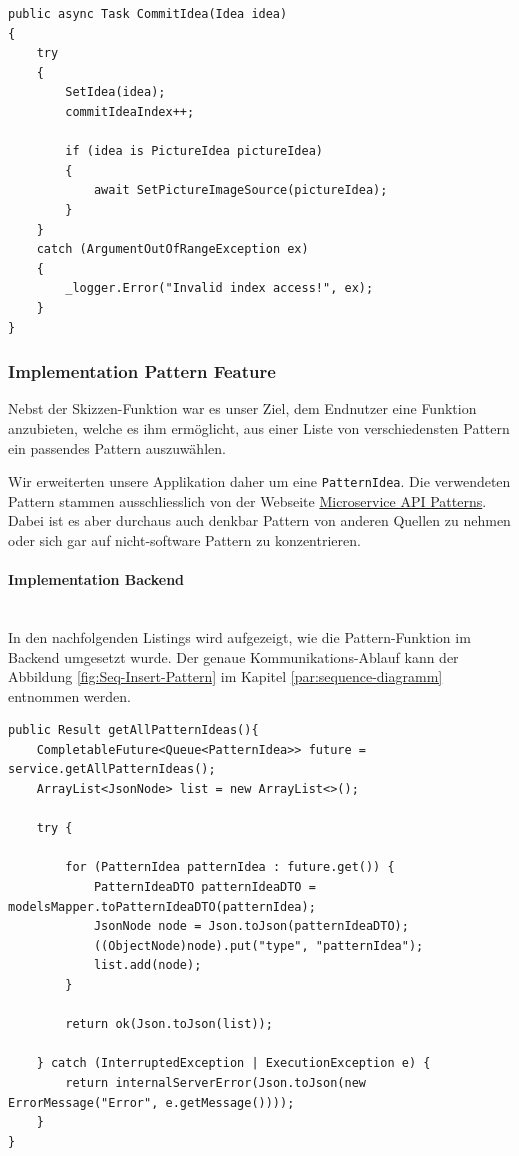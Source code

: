 \begin{lstlisting}[caption={Commit-Idea Methode auf dem BrainstormingService}, label={commit-idea}]
public async Task CommitIdea(Idea idea)
{
	try
	{
		SetIdea(idea);
		commitIdeaIndex++;
		
		if (idea is PictureIdea pictureIdea)
		{
			await SetPictureImageSource(pictureIdea);
		}
	}
	catch (ArgumentOutOfRangeException ex)
	{
		_logger.Error("Invalid index access!", ex);
	}
}
\end{lstlisting}

\subsubsection{Implementation Pattern Feature}
Nebst der Skizzen-Funktion war es unser Ziel, dem Endnutzer eine Funktion anzubieten, welche es ihm ermöglicht, aus einer Liste von verschiedensten Pattern ein passendes Pattern auszuwählen. 

Wir erweiterten unsere Applikation daher um eine \texttt{PatternIdea}. Die verwendeten Pattern stammen ausschliesslich von der Webseite \href{https://microservice-api-patterns.org}{Microservice API Patterns}. Dabei ist es aber durchaus auch denkbar Pattern von anderen Quellen zu nehmen oder sich gar auf nicht-software Pattern zu konzentrieren.

\paragraph*{Implementation Backend}~\\
In den nachfolgenden Listings wird aufgezeigt, wie die Pattern-Funktion im Backend umgesetzt wurde.
Der genaue Kommunikations-Ablauf kann der Abbildung \ref{fig:Seq-Insert-Pattern} im Kapitel \ref{par:sequence-diagramm} entnommen werden.

\begin{lstlisting}[caption={Alle Pattern holen im Pattern Controller}, label=getAllPatternInController]
 public Result getAllPatternIdeas(){
    CompletableFuture<Queue<PatternIdea>> future = service.getAllPatternIdeas();
    ArrayList<JsonNode> list = new ArrayList<>();

    try {

        for (PatternIdea patternIdea : future.get()) {
            PatternIdeaDTO patternIdeaDTO = modelsMapper.toPatternIdeaDTO(patternIdea);
            JsonNode node = Json.toJson(patternIdeaDTO);
            ((ObjectNode)node).put("type", "patternIdea");
            list.add(node);
        }

        return ok(Json.toJson(list));

    } catch (InterruptedException | ExecutionException e) {
        return internalServerError(Json.toJson(new ErrorMessage("Error", e.getMessage())));
    }
}
\end{lstlisting}

